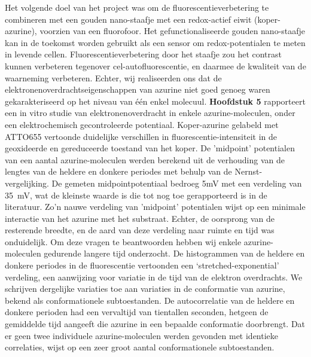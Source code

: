 Het volgende doel van het project was om de fluorescentieverbetering te combineren met een gouden nano-staafje met een redox-actief eiwit (koper-azurine), voorzien van een fluorofoor. Het gefunctionaliseerde gouden nano-staafje kan in de toekomst worden gebruikt als een sensor om redox-potentialen te meten in levende cellen. Fluorescentieverbetering door het staafje zou het contrast kunnen verbeteren tegenover cel-autofluorescentie, en daarmee de kwaliteit van de waarneming verbeteren. Echter, wij realiseerden ons dat de elektronenoverdrachtseigenschappen van azurine niet goed genoeg waren gekarakteriseerd op het niveau van één enkel molecuul. \textbf{Hoofdstuk 5} rapporteert een in vitro studie van elektronenoverdracht in enkele azurine-moleculen, onder een elektrochemisch gecontroleerde potentiaal. Koper-azurine gelabeld met ATTO655 vertoonde duidelijke verschillen in fluorescentie-intensiteit in de geoxideerde en gereduceerde toestand van het koper. De ’midpoint’ potentialen van een aantal azurine-moleculen werden berekend uit de verhouding van de lengtes van de heldere en donkere periodes met behulp van de Nernst-vergelijking. De gemeten midpointpotentiaal bedroeg 5mV met een verdeling  van \SI{35}{\mV}, wat de kleinste waarde is die tot nog toe  gerapporteerd is in de
literatuur. Zo'n nauwe verdeling van ’midpoint’ potentialen wijst op een minimale interactie van het azurine met het substraat. Echter, de oorsprong van de resterende breedte, en de aard van deze verdeling naar ruimte en tijd was onduidelijk. Om deze vragen te beantwoorden hebben wij enkele azurine-moleculen gedurende langere tijd onderzocht. De histogrammen van de heldere en donkere periodes in de fluorescentie vertoonden een ‘stretched-exponential’ verdeling, een aanwijzing voor variatie in de tijd van de elektron overdrachts. We schrijven dergelijke variaties toe aan variaties in de conformatie  van azurine, bekend als conformationele subtoestanden. De autocorrelatie van de heldere en donkere perioden had een vervaltijd van tientallen seconden, hetgeen de gemiddelde tijd aangeeft die azurine in een bepaalde conformatie doorbrengt. Dat er geen twee individuele azurine-moleculen werden gevonden met identieke correlaties, wijst op  een zeer groot aantal conformationele subtoestanden.